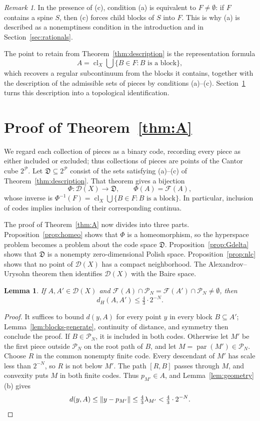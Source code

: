 \documentclass[11pt]{amsart}
\newtheorem{lemma}[theorem]{Lemma}
\theoremstyle{definition}
\theoremstyle{remark}
\newtheorem{remark}[theorem]{Remark}
\newcommand{\clX}{\operatorname{cl}_X}
\newcommand{\pa}{\operatorname{par}}
\newcommand{\D}{\mathcal{D}}
\newcommand{\Pc}{\mathcal{P}}
\newcommand{\Fc}{\mathcal{F}}
\newcommand{\Dc}{\mathfrak{D}}
\newcommand{\dH}{d_H}
\begin{document}
\begin{remark}\label{rem:nonempty}
In the presence of (c), condition (a) is equivalent to $F\neq\emptyset$: if $F$ contains a spine $S$, then (c) forces child blocks of $S$ into $F$. This is why (a) is described as a nonemptiness condition in the introduction and in Section~\ref{sec:rationals}.
\end{remark}

The point to retain from Theorem~\ref{thm:description} is the representation formula
\[
A=\clX\bigcup\{B\in F: B\text{ is a block}\},
\]
which recovers a regular subcontinuum from the blocks it contains, together with the description of the admissible sets of pieces by conditions (a)--(c). Section~\ref{sec:proofA} turns this description into a topological identification.

\section{\texorpdfstring{Proof of Theorem~\ref{thm:A}}{Proof of Theorem A}}\label{sec:proofA}

We regard each collection of pieces as a binary code, recording every piece as either included or excluded; thus collections of pieces are points of the Cantor cube $2^\Pc$. Let $\Dc\subseteq2^\Pc$ consist of the sets satisfying (a)--(c) of Theorem~\ref{thm:description}. That theorem gives a bijection
\[
\Phi\colon\D(X)\longrightarrow\Dc,\qquad \Phi(A)=\Fc(A),
\]
whose inverse is $\Phi^{-1}(F)=\clX\bigcup\{B\in F: B\text{ is a block}\}$. In particular, inclusion of codes implies inclusion of their corresponding continua.

The proof of Theorem~\ref{thm:A} now divides into three parts. Proposition~\ref{prop:homeo} shows that $\Phi$ is a homeomorphism, so the hyperspace problem becomes a problem about the code space $\Dc$. Proposition~\ref{prop:Gdelta} shows that $\Dc$ is a nonempty zero-dimensional Polish space. Proposition~\ref{prop:nlc} shows that no point of $\D(X)$ has a compact neighborhood. The Alexandrov--Urysohn theorem then identifies $\D(X)$ with the Baire space.

\begin{lemma}\label{lem:estimate}
If $A,A'\in\D(X)$ and $\Fc(A)\cap\Pc_N=\Fc(A')\cap\Pc_N\neq\emptyset$, then
\[
\dH(A,A')\le\tfrac43\cdot2^{-N}.
\]
\end{lemma}

\begin{proof}
It suffices to bound $d(y,A)$ for every point $y$ in every block $B\subseteq A'$; Lemma~\ref{lem:blocks-generate}, continuity of distance, and symmetry then conclude the proof. If $B\in\Pc_N$, it is included in both codes. Otherwise let $M'$ be the first piece outside $\Pc_N$ on the root path of $B$, and let $M=\pa(M')\in\Pc_N$. Choose $R$ in the common nonempty finite code. Every descendant of $M'$ has scale less than $2^{-N}$, so $R$ is not below $M'$. The path $[R,B]$ passes through $M$, and convexity puts $M$ in both finite codes. Thus $p_{M'}\in A$, and Lemma~\ref{lem:geometry}(b) gives
\[
d(y,A)\le\|y-p_{M'}\|\le\tfrac43\lambda_{M'}<\tfrac43\cdot2^{-N}.\qedhere
\]
\end{proof}
\end{document}
